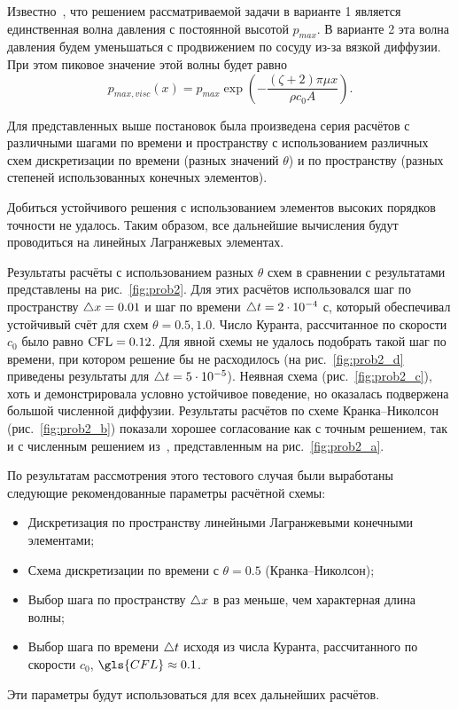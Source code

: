 Известно~\cite{boileau:2015}, что решением рассматриваемой задачи
в варианте 1 является единственная волна давления с постоянной высотой $p_{max}$.
В варианте 2 эта волна давления будем уменьшаться с продвижением по сосуду из-за вязкой диффузии. При
этом пиковое значение этой волны будет равно
\begin{equation}
\label{eq:p_peak_visc}
p_{max, visc}(x) = p_{max} \exp\left(-\frac{(\zeta + 2)\pi \mu x}{\rho c_0 A}\right).
\end{equation}

Для представленных выше постановок
была произведена серия расчётов с различными шагами по времени и пространству
с использованием различных схем дискретизации по времени (разных значений $\theta$)
и по пространству (разных степеней использованных конечных элементов).

Добиться устойчивого решения с использованием элементов высоких порядков точности
не удалось. Таким образом, все дальнейшие вычисления
будут проводиться на линейных Лагранжевых элементах.

Результаты расчёты с использованием разных $\theta$ 
схем в сравнении с результатами~\cite{boileau:2015}
представлены на рис.~\ref{fig:prob2}.
Для этих расчётов использовался шаг по пространству $\triangle x = 0.01$
и шаг по времени $\triangle t = 2\cdot10^{-4}$ с,
который обеспечивал устойчивый счёт для схем $\theta=0.5, 1.0$.
Число Куранта, рассчитанное по скорости $c_0$ было равно $\mathrm{CFL} = 0.12$.
Для явной схемы
не удалось подобрать такой шаг по времени, при котором решение
бы не расходилось (на рис.~\ref{fig:prob2_d} приведены результаты для $\triangle t=5\cdot10^{-5}$).
Неявная схема (рис.~\ref{fig:prob2_c}), хоть и демонстрировала условно устойчивое поведение,
но оказалась подвержена большой численной диффузии.
Результаты расчётов по схеме Кранка--Николсон (рис.~\ref{fig:prob2_b})
показали хорошее согласование как с точным решением, так и с численным решением из~\cite{boileau:2015},
представленным на рис.~\ref{fig:prob2_a}.

По результатам рассмотрения этого тестового случая были выработаны следующие
рекомендованные параметры расчётной схемы:
\begin{itemize}
\item Дискретизация по пространству линейными Лагранжевыми конечными элементами;
\item Схема дискретизации по времени с $\theta=0.5$ (Кранка--Николсон);
\item Выбор шага по пространству $\triangle x$ в  раз меньше, чем характерная длина волны;
\item Выбор шага по времени $\triangle t$ исходя из числа Куранта, рассчитанного по скорости $c_0$, $\gls{CFL} \approx 0.1$.
\end{itemize}
Эти параметры будут использоваться для всех дальнейших расчётов.

